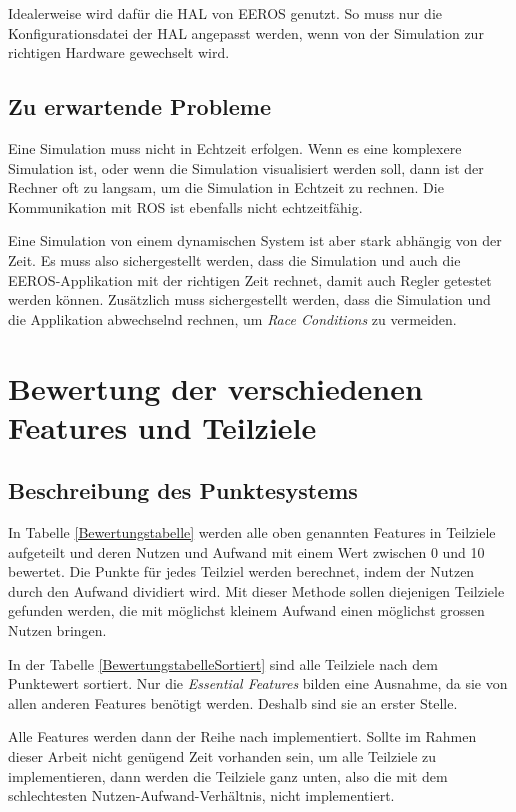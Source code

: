 Idealerweise wird dafür die HAL von EEROS genutzt.
So muss nur die Konfigurationsdatei der HAL angepasst werden, wenn von der Simulation zur richtigen Hardware gewechselt wird.

\subsection{Zu erwartende Probleme}
Eine Simulation muss nicht in Echtzeit erfolgen.
Wenn es eine komplexere Simulation ist, oder wenn die Simulation visualisiert werden soll, dann ist der Rechner oft zu langsam, um die Simulation in Echtzeit zu rechnen.
Die Kommunikation mit ROS ist ebenfalls nicht echtzeitfähig.

Eine Simulation von einem dynamischen System ist aber stark abhängig von der Zeit.
Es muss also sichergestellt werden, dass die Simulation und auch die EEROS-Applikation mit der richtigen Zeit rechnet, damit auch Regler getestet werden können.
Zusätzlich muss sichergestellt werden, dass die Simulation und die Applikation abwechselnd rechnen, um \textit{Race Conditions} zu vermeiden.


\section{Bewertung der verschiedenen Features und Teilziele}
\subsection{Beschreibung des Punktesystems}
In Tabelle \ref{Bewertungstabelle} werden alle oben genannten Features in Teilziele aufgeteilt und deren Nutzen und Aufwand mit einem Wert zwischen 0 und 10 bewertet.
Die Punkte für jedes Teilziel werden berechnet, indem der Nutzen durch den Aufwand dividiert wird.
Mit dieser Methode sollen diejenigen Teilziele gefunden werden, die mit möglichst kleinem Aufwand einen möglichst grossen Nutzen bringen.

In der Tabelle \ref{BewertungstabelleSortiert} sind alle Teilziele nach dem Punktewert sortiert.
Nur die \textit{Essential Features} bilden eine Ausnahme, da sie von allen anderen Features benötigt werden.
Deshalb sind sie an erster Stelle.

Alle Features werden dann der Reihe nach implementiert.
Sollte im Rahmen dieser Arbeit nicht genügend Zeit vorhanden sein, um alle Teilziele zu implementieren, dann werden die Teilziele ganz unten, also die mit dem schlechtesten Nutzen-Aufwand-Verhältnis, nicht implementiert.


